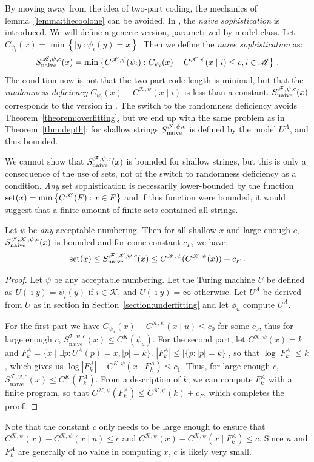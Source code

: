 \documentclass{style/llncs}
\newcommand{\M}{\mathscr M}
\newcommand{\T}{\mathscr T}
\newcommand{\F}{\mathscr F}
\newcommand{\K}{\mathscr K}
\newcommand{\tn}[1]{\textnormal{#1}}
\newcommand{\s}{S}
\newcommand{\bi}{\bar\imath}
\newcommand{\p}{\,\text{.}}
\begin{document}
By moving away from the idea of two-part coding, the mechanics of lemma~\ref{lemma:thecoolone} can be avoided. In \cite{mota2013sophistication}, the \emph{naive sophistication} is introduced. We will define a generic version, parametrized by model class. Let $C_{\psi_i}(x) = \min\left\{|y| : \psi_i(y) = x\right\}$. Then we define the \emph{naive sophistication} as:
\[
\s_\tn{naive}^{\M, \psi, c}(x) = \min\left\{C^{\K, \psi}(\psi_i) : C_{\psi_i}(x) - C^{\K,\psi}(x\mid i) \leq c, i \in \M \right\} \p
\]
\noindent The condition now is not that the two-part code length is minimal, but that the \emph{randomness deficiency} $C_{\psi_i}(x) - C^{\K,\psi}(x\mid i)$ is less than a constant. $S_\tn{naive}^{\F,\psi,c}(x)$ corresponds to the version in \cite{mota2013sophistication}. The switch to the randomness deficiency avoids Theorem~\ref{theorem:overfitting}, but we end up with the same problem as in Theorem~\ref{thm:depth}: for shallow strings $S_\tn{naive}^{\T, \psi, c}$ is defined by the model $U^A$, and thus bounded.

We cannot show that $S_\tn{naive}^{\F, \psi, c}(x)$ is bounded for shallow strings, but this is only a consequence of the use of sets, not of the switch to randomness deficiency as a condition. \emph{Any} set sophistication is necessarily lower-bounded by the function $\tn{set}(x) = \min\left\{C^\K(F) : x \in F\right\}$ and if this function were bounded, it would suggest that a finite amount of finite sets contained all strings.
\begin{theorem}
Let $\psi$ be \emph{any} acceptable numbering. Then for all shallow $x$ and large enough $c$, $S_\tn{naive}^{\T,\K,\psi,c}(x)$ is bounded and for come constant $c_F$, we have:\belowdisplayskip=-12pt
\[
\tn{set}(x) \leq S_\tn{naive}^{\F,\K,\psi,c}(x) \leq C^{\K,\psi}(C^{\K, \psi}(x)) + c_F \p
\]\label{theorem:naive}
\end{theorem}
\begin{proof}
Let $\psi$ be any acceptable numbering. Let the Turing machine $U$ be defined as $U(\bi y) = \psi_i(y)$ if $i \in \K$, and $U(\bi y) = \infty$ otherwise. Let $U^A$ be derived from $U$ as in section in Section~\ref{section:underfitting} and let $\phi_u$ compute $U^A$.

For the first part we have $C_{\psi_u}(x) - C^{\K, \psi}(x\mid u) \leq c_0$ for some $c_0$, thus for large enough $c$, $\s_\text{naive}^{\T,\psi,c}(x) \leq C^K(\psi_u)$. For the second part, let $C^{\K,\psi}(x) = k$ and $F^A_k = \{x \mid \exists p : U^A(p) = x, |p| = k\}$. $|F^A_k| \leq |\{p : |p| = k\}|$, so that $\log |F^A_k| \leq k$, which gives us $\log |F^A_k| - C^{K, \psi}(x \mid F^A_k) \leq c_1$. Thus, for large enough $c$, $\s_\text{naive}^{\F,\psi,c}(x) \leq C^K(F^A_k)$. From a description of $k$, we can compute $F^A_k$ with a finite program, so that $C^{\K,\psi}(F^A_k) \leq C^{\K,\psi}(k) + c_F$, which completes the proof.
\end{proof}
Note that the constant $c$ only needs to be large enough to ensure that $C^{\K,\psi}(x) - C^{\K,\psi}(x\mid u) \leq c$ and $C^{\K,\psi}(x) - C^{\K,\psi}(x\mid F^A_k)\leq c$. Since $u$ and $F^A_k$ are generally of no value in computing $x$, $c$ is likely very small.
\end{document}
